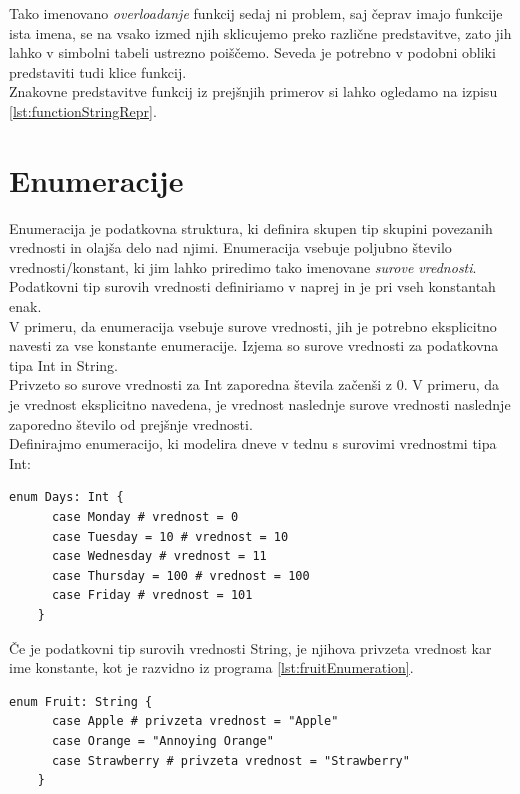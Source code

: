 \documentclass[a4paper, 12p]{book}
\begin{document}
Tako imenovano \textit{overloadanje} funkcij sedaj ni problem, saj čeprav imajo funkcije ista imena, se na vsako izmed njih sklicujemo preko različne predstavitve, zato jih lahko v simbolni tabeli ustrezno poiščemo. Seveda je potrebno v podobni obliki predstaviti tudi klice funkcij. \\
\indent Znakovne predstavitve funkcij iz prejšnjih primerov si lahko ogledamo na izpisu \ref{lst:functionStringRepr}.

\section{Enumeracije}

Enumeracija je podatkovna struktura, ki definira skupen tip skupini povezanih vrednosti in olajša delo nad njimi. Enumeracija vsebuje poljubno število vrednosti/konstant, ki jim lahko priredimo tako imenovane \textit{surove vrednosti}. Podatkovni tip surovih vrednosti definiriamo v naprej in je pri vseh konstantah enak. \\
\indent V primeru, da enumeracija vsebuje surove vrednosti, jih je potrebno eksplicitno navesti za vse konstante enumeracije. Izjema so surove vrednosti za podatkovna tipa {\ttfamily Int} in {\ttfamily String}. \\
\indent Privzeto so surove vrednosti za {\ttfamily Int} zaporedna števila začenši z 0. V primeru, da je vrednost eksplicitno navedena, je vrednost naslednje surove vrednosti naslednje zaporedno število od prejšnje vrednosti. \\
\indent Definirajmo enumeracijo, ki modelira dneve v tednu s surovimi vrednostmi tipa {\ttfamily Int}:

\renewcommand{\lstlistingname}{Program}
\begin{lstlisting}[caption={}, captionpos=b]
	enum Days: Int {
	  case Monday # vrednost = 0
	  case Tuesday = 10 # vrednost = 10
	  case Wednesday # vrednost = 11
	  case Thursday = 100 # vrednost = 100
	  case Friday # vrednost = 101
	}
\end{lstlisting}

\indent Če je podatkovni tip surovih vrednosti {\ttfamily String}, je njihova privzeta vrednost kar ime konstante, kot je razvidno iz programa \ref{lst:fruitEnumeration}.

\begin{lstlisting}[caption={Enumeracija s surovimi vrednostmi tipa String.}, captionpos=b, label={lst:fruitEnumeration}]
	enum Fruit: String {
	  case Apple # privzeta vrednost = "Apple"
	  case Orange = "Annoying Orange"
	  case Strawberry # privzeta vrednost = "Strawberry"
	}
\end{lstlisting}
\end{document}
